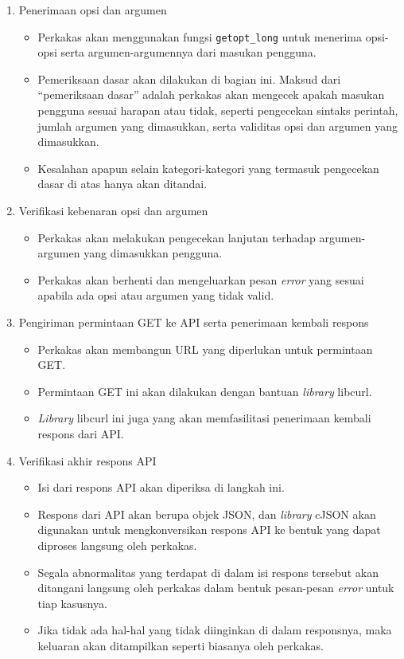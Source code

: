 \begin{enumerate}
	\item Penerimaan opsi dan argumen
	\begin{itemize}
		\item Perkakas akan menggunakan fungsi \verb|getopt_long| untuk menerima opsi-opsi serta argumen-argumennya dari masukan pengguna.
		\item Pemeriksaan dasar akan dilakukan di bagian ini. Maksud dari ``pemeriksaan dasar'' adalah perkakas akan mengecek apakah masukan pengguna sesuai harapan atau tidak, seperti pengecekan sintaks perintah, jumlah argumen yang dimasukkan, serta validitas opsi dan argumen yang dimasukkan.
		\item Kesalahan apapun selain kategori-kategori yang termasuk pengecekan dasar di atas hanya akan ditandai.
	\end{itemize}
	
	\item Verifikasi kebenaran opsi dan argumen
	\begin{itemize}
		\item Perkakas akan melakukan pengecekan lanjutan terhadap argumen-argumen yang dimasukkan pengguna.
		\item Perkakas akan berhenti dan mengeluarkan pesan \textit{error} yang sesuai apabila ada opsi atau argumen yang tidak valid.
	\end{itemize}	
	
	\item Pengiriman permintaan GET ke API serta penerimaan kembali respons
	\begin{itemize}
		\item Perkakas akan membangun URL yang diperlukan untuk permintaan GET. 
		\item Permintaan GET ini akan dilakukan dengan bantuan \textit{library} libcurl.
		\item \textit{Library} libcurl ini juga yang akan memfasilitasi penerimaan kembali respons dari API.
	\end{itemize}	
	
	\item Verifikasi akhir respons API
	\begin{itemize}
		\item Isi dari respons API akan diperiksa di langkah ini.
		\item Respons dari API akan berupa objek JSON, dan \textit{library} cJSON akan digunakan untuk mengkonversikan respons API ke bentuk yang dapat diproses langsung oleh perkakas.
		\item Segala abnormalitas yang terdapat di dalam isi respons tersebut akan ditangani langsung oleh perkakas dalam bentuk pesan-pesan \textit{error} untuk tiap kasusnya.
		\item Jika tidak ada hal-hal yang tidak diinginkan di dalam responsnya, maka keluaran akan ditampilkan seperti biasanya oleh perkakas.
	\end{itemize}
	
\end{enumerate}


